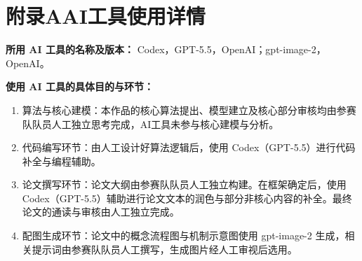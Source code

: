 \documentclass[withoutpreface,bwprint]{cumcmthesis}
\begin{document}
\appendix

\section*{附录A\quad AI工具使用详情}

\textbf{所用 AI 工具的名称及版本：} Codex，GPT-5.5，OpenAI\cite{codex}；gpt-image-2，OpenAI\cite{gptimage2}。

\textbf{使用 AI 工具的具体目的与环节：}
\begin{enumerate}[leftmargin=*]
	\item 算法与核心建模：本作品的核心算法提出、模型建立及核心部分审核均由参赛队队员人工独立思考完成，AI工具未参与核心建模与分析。
	\item 代码编写环节：由人工设计好算法逻辑后，使用 Codex（GPT-5.5）进行代码补全与编程辅助。
	\item 论文撰写环节：论文大纲由参赛队队员人工独立构建。在框架确定后，使用 Codex（GPT-5.5）辅助进行论文文本的润色与部分非核心内容的补全。最终论文的通读与审核由人工独立完成。
	\item 配图生成环节：论文中的概念流程图与机制示意图使用 gpt-image-2 生成，相关提示词由参赛队队员人工撰写，生成图片经人工审视后选用。
\end{enumerate}
\end{document}
